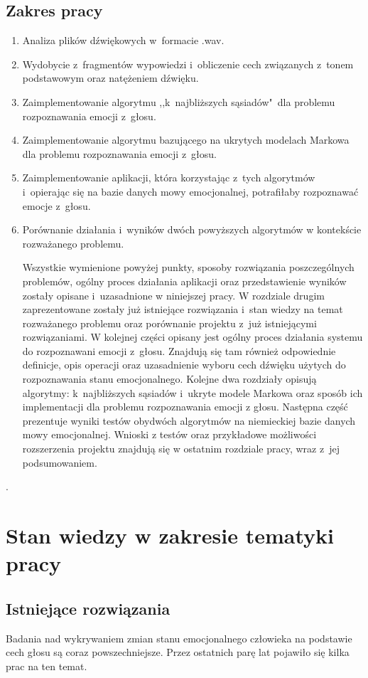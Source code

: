 \documentclass[declaration,shortabstract]{iithesis}
\begin{document}
\section{Zakres pracy}
\begin{enumerate}
\item Analiza plików dźwiękowych w~formacie .wav.
\item Wydobycie z~fragmentów wypowiedzi i~obliczenie cech związanych z~tonem podstawowym oraz natężeniem dźwięku.
\item Zaimplementowanie algorytmu ,,k~najbliższych sąsiadów"~dla problemu rozpoznawania emocji z~głosu.
\item Zaimplementowanie algorytmu bazującego na ukrytych modelach Markowa dla problemu rozpoznawania emocji z~głosu.
\item Zaimplementowanie aplikacji, która korzystając z~tych algorytmów i~opierając się na bazie danych mowy emocjonalnej, potrafiłaby rozpoznawać emocje z~głosu.
\item Porównanie działania i~wyników dwóch powyższych algorytmów w kontekście rozważanego problemu.

Wszystkie wymienione powyżej punkty, sposoby rozwiązania poszczególnych problemów, ogólny proces działania aplikacji oraz przedstawienie wyników zostały opisane i~uzasadnione w niniejszej pracy. W rozdziale drugim zaprezentowane zostały już istniejące rozwiązania i~stan wiedzy na temat rozważanego problemu oraz porównanie projektu z~już istniejącymi rozwiązaniami. W kolejnej części opisany jest ogólny proces działania systemu do rozpoznawani emocji z~głosu. Znajdują się tam również odpowiednie definicje, opis operacji oraz uzasadnienie wyboru cech dźwięku użytych do rozpoznawania stanu emocjonalnego. Kolejne dwa rozdziały opisują algorytmy: k~najbliższych sąsiadów i~ukryte modele Markowa oraz sposób ich implementacji dla problemu rozpoznawania emocji z głosu. Następna część prezentuje wyniki testów obydwóch algorytmów na niemieckiej bazie danych mowy emocjonalnej. Wnioski z testów oraz przykładowe możliwości rozszerzenia projektu znajdują się w ostatnim rozdziale pracy, wraz z~jej podsumowaniem.

\end{enumerate}.

\chapter{Stan wiedzy w zakresie tematyki pracy}
\section{Istniejące rozwiązania}
Badania nad wykrywaniem zmian stanu emocjonalnego człowieka na podstawie cech głosu są coraz powszechniejsze. Przez ostatnich parę lat pojawiło się kilka prac na ten temat. 
\end{document}
